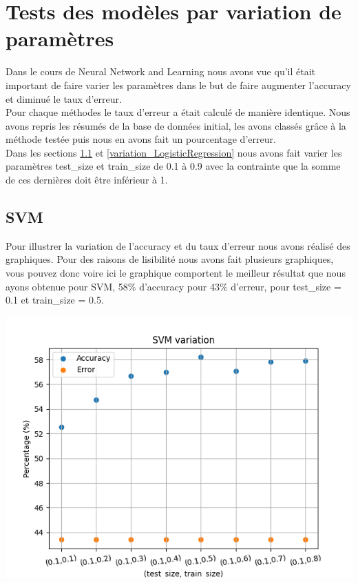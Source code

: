 \section{Tests des modèles par variation de paramètres}
Dans le cours de Neural Network and Learning nous avons vue qu’il était important de faire varier les paramètres dans le but de faire augmenter l’accuracy et diminué le taux d’erreur.\\
Pour chaque méthodes le taux d’erreur a était calculé de manière identique. Nous avons repris les résumés de la base de données initial, les avons classés grâce à la méthode testée puis nous en avons fait un pourcentage d’erreur.\\
Dans les sections \ref{variation_SVM} et \ref{variation_LogisticRegression}  nous avons fait varier les paramètres test\_size et train\_size de 0.1 à 0.9 avec la contrainte que la somme de ces dernières doit être inférieur à 1.

\subsection{SVM} \label{variation_SVM}
Pour illustrer la variation de l’accuracy et du taux d’erreur nous avons réalisé des graphiques. Pour des raisons de lisibilité nous avons fait plusieurs graphiques, vous pouvez donc voire ici le graphique comportent le meilleur résultat que nous ayons obtenue pour SVM, 58\% d’accuracy pour 43\% d’erreur, pour test\_size = 0.1 et train\_size = 0.5.
\begin{center}
    \includegraphics[scale=1]{graphs/svm-variation-0.png}
\end{center}

